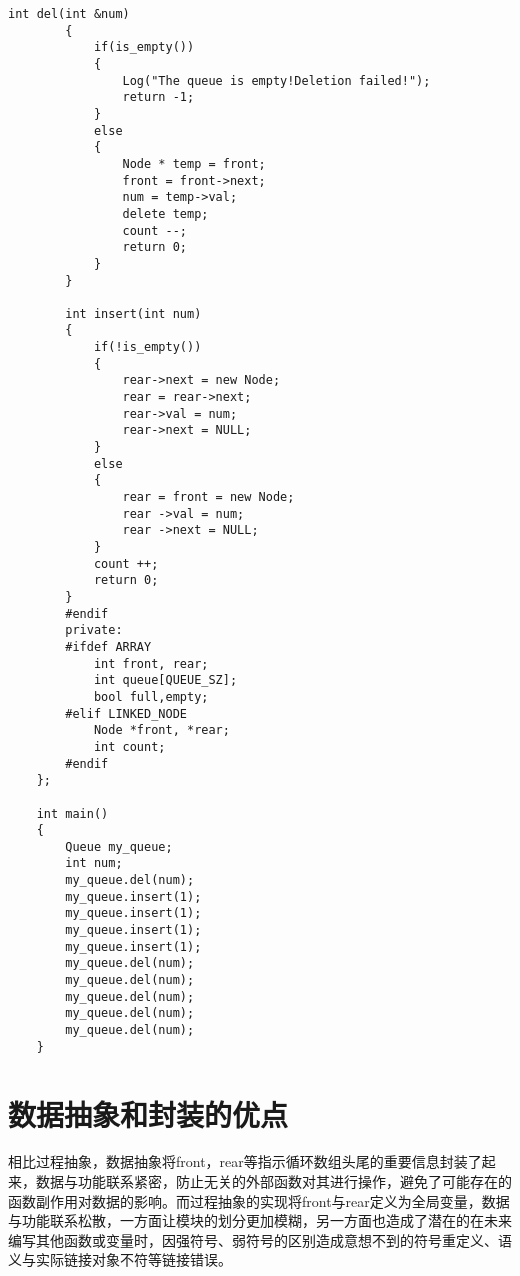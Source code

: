 \documentclass[UTF8]{ctexart}
\begin{document}
\begin{lstlisting}[language={[ANSI]C++}]
        int del(int &num)
        {
            if(is_empty())
            {
                Log("The queue is empty!Deletion failed!");
                return -1;           
            }
            else
            {
                Node * temp = front;
                front = front->next;
                num = temp->val;
                delete temp;
                count --;
                return 0;
            }
        }
    
        int insert(int num)
        {
            if(!is_empty())
            {
                rear->next = new Node;
                rear = rear->next;
                rear->val = num;
                rear->next = NULL;
            }
            else
            {
                rear = front = new Node;
                rear ->val = num;
                rear ->next = NULL;
            }
            count ++;
            return 0;
        }
        #endif
        private:
        #ifdef ARRAY
            int front, rear;
            int queue[QUEUE_SZ];
            bool full,empty;
        #elif LINKED_NODE
            Node *front, *rear;
            int count;
        #endif
    };
    
    int main()
    {
        Queue my_queue;
        int num;
        my_queue.del(num);
        my_queue.insert(1);
        my_queue.insert(1);
        my_queue.insert(1);
        my_queue.insert(1);
        my_queue.del(num);
        my_queue.del(num);
        my_queue.del(num);
        my_queue.del(num);
        my_queue.del(num);
    }   
\end{lstlisting}
\section{数据抽象和封装的优点}
    相比过程抽象，数据抽象将front，rear等指示循环数组头尾的重要信息封装了起来，数据与功能联系紧密，防止无关的外部函数对其进行操作，避免了可能存在的函数副作用对数据的影响。而过程抽象的实现将front与rear定义为全局变量，数据与功能联系松散，一方面让模块的划分更加模糊，另一方面也造成了潜在的在未来编写其他函数或变量时，因强符号、弱符号的区别造成意想不到的符号重定义、语义与实际链接对象不符等链接错误。
\end{document}
